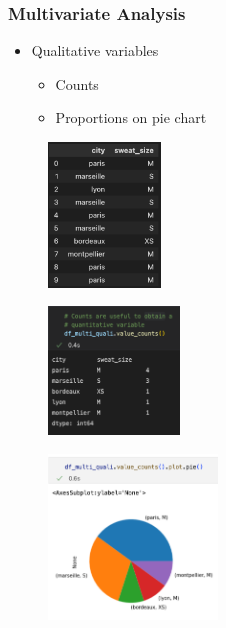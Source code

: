 \begin{frame}\frametitle{Multivariate Analysis}
   \begin{minipage}{0.48\linewidth}
      \begin{itemize}
         \item Qualitative variables
         \begin{itemize}
            \item Counts
            \item Proportions on pie chart
         \end{itemize}
      \end{itemize}
      \vspace{.5cm}
      \begin{figure}[H]
         \includegraphics[width=3cm]{../images/illustrations/pattern_multivariate_qualitative_df.png}
      \end{figure}
   \end{minipage}
   \begin{minipage}{0.48\linewidth}
      \begin{figure}[H]
         \includegraphics[width=3.5cm]{../images/illustrations/pattern_multivariate_qualitative_counts.png}
      \end{figure}
      \begin{figure}[H]
         \includegraphics[width=4.5cm]{../images/illustrations/pattern_multivariate_qualitative_pie.png}
      \end{figure}
   \end{minipage}
\end{frame}



